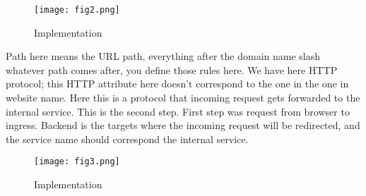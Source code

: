 \begin{figure}
    \centering
    \texttt{[image: fig2.png]}
    \caption{Implementation}
    \label{fig:my_label}
\end{figure}

Path here means the URL path, everything after the domain name slash whatever path comes after, you define those rules here. 
We have here HTTP protocol; this HTTP attribute here doesn’t correspond to the one in the one in website name. Here this is a protocol that incoming request gets forwarded to the internal service. This is the second step. 
First step was request from browser to ingress.  Backend is the targets where the incoming request will be redirected, and the service name should correspond the internal service.

\begin{figure}
    \centering
    \texttt{[image: fig3.png]}
    \caption{Implementation}
    \label{fig:my_label}
\end{figure}




